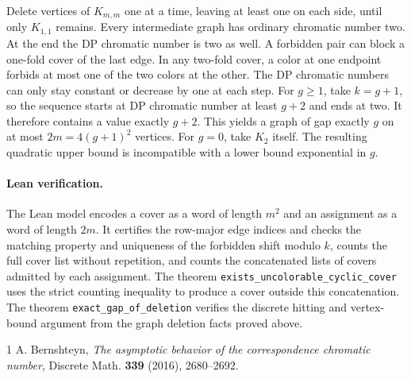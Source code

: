 \documentclass[10pt]{article}
\begin{document}
Delete vertices of \(K_{m,m}\) one at a time, leaving at least one on each
side, until only \(K_{1,1}\) remains. Every intermediate graph has
ordinary chromatic number two. At the end the DP chromatic number is
two as well. A forbidden pair can block a one-fold cover of the last edge.
In any two-fold cover, a color at one endpoint forbids at most one of the
two colors at the other. The DP chromatic numbers can only stay constant or decrease
by one at each step. For \(g\ge1\), take \(k=g+1\), so the sequence starts
at DP chromatic number at least \(g+2\) and ends at two. It therefore
contains a value exactly \(g+2\). This yields a graph of gap exactly \(g\)
on at most \(2m=4(g+1)^2\) vertices. For \(g=0\), take \(K_2\) itself.
The resulting quadratic upper bound is incompatible with a lower bound
exponential in \(g\).

\paragraph{Lean verification.}
The Lean model encodes a cover as a word of length \(m^2\) and an assignment
as a word of length \(2m\). It certifies the row-major edge indices and
checks the matching property and uniqueness of the forbidden shift
modulo \(k\), counts the full cover list without repetition, and counts the
concatenated lists of covers admitted by each assignment. The theorem
\texttt{exists\_uncolorable\_cyclic\_cover} uses the strict counting inequality
to produce a cover outside this concatenation. The theorem
\texttt{exact\_gap\_of\_deletion} verifies the discrete hitting and vertex-bound
argument from the graph deletion facts proved above.

\begin{thebibliography}{1}
 A. Bernshteyn, \emph{The asymptotic behavior of the
correspondence chromatic number}, Discrete Math. \textbf{339} (2016),
2680--2692.
\end{thebibliography}
\end{document}
